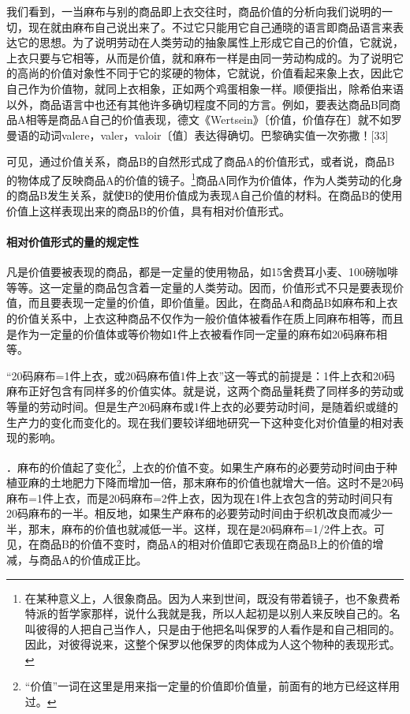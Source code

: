 \documentclass{ctexbook}
\begin{document}
                我们看到，一当麻布与别的商品即上衣交往时，商品价值的分析向我们说明的一切，现在就由麻布自己说出来了。不过它只能用它自己通晓的语言即商品语言来表达它的思想。为了说明劳动在人类劳动的抽象属性上形成它自己的价值，它就说，上衣只要与它相等，从而是价值，就和麻布一样是由同一劳动构成的。为了说明它的高尚的价值对象性不同于它的浆硬的物体，它就说，价值看起来象上衣，因此它自己作为价值物，就同上衣相象，正如两个鸡蛋相象一样。顺便指出，除希伯来语以外，商品语言中也还有其他许多确切程度不同的方言。例如，要表达商品B同商品A相等是商品A自己的价值表现，德文《Wertsein》〔价值，价值存在〕就不如罗曼语的动词valere，valer，valoir〔值〕表达得确切。巴黎确实值一次弥撒！[33]
                
                可见，通过价值关系，商品B的自然形式成了商品A的价值形式，或者说，商品B的物体成了反映商品A的价值的镜子。\footnote{在某种意义上，人很象商品。因为人来到世间，既没有带着镜子，也不象费希特派的哲学家那样，说什么我就是我，所以人起初是以别人来反映自己的。名叫彼得的人把自己当作人，只是由于他把名叫保罗的人看作是和自己相同的。因此，对彼得说来，这整个保罗以他保罗的肉体成为人这个物种的表现形式。}商品A同作为价值体，作为人类劳动的化身的商品B发生关系，就使B的使用价值成为表现A自己价值的材料。在商品B的使用价值上这样表现出来的商品B的价值，具有相对价值形式。
                
                \paragraph{相对价值形式的量的规定性}

                凡是价值要被表现的商品，都是一定量的使用物品，如15舍费耳小麦、100磅咖啡等等。这一定量的商品包含着一定量的人类劳动。因而，价值形式不只是要表现价值，而且要表现一定量的价值，即价值量。因此，在商品A和商品B如麻布和上衣的价值关系中，上衣这种商品不仅作为一般价值体被看作在质上同麻布相等，而且是作为一定量的价值体或等价物如1件上衣被看作同一定量的麻布如20码麻布相等。
                
                “20码麻布=1件上衣，或20码麻布值1件上衣”这一等式的前提是：1件上衣和20码麻布正好包含有同样多的价值实体。就是说，这两个商品量耗费了同样多的劳动或等量的劳动时间。但是生产20码麻布或1件上衣的必要劳动时间，是随着织或缝的生产力的变化而变化的。现在我们要较详细地研究一下这种变化对价值量的相对表现的影响。
                
                \uppercase\expandafter{}．麻布的价值起了变化\footnote{“价值”一词在这里是用来指一定量的价值即价值量，前面有的地方已经这样用过。}，上衣的价值不变。如果生产麻布的必要劳动时间由于种植亚麻的土地肥力下降而增加一倍，那末麻布的价值也就增大一倍。这时不是20码麻布=1件上衣，而是20码麻布=2件上衣，因为现在1件上衣包含的劳动时间只有20码麻布的一半。相反地，如果生产麻布的必要劳动时间由于织机改良而减少一半，那末，麻布的价值也就减低一半。这样，现在是20码麻布=1/2件上衣。可见，在商品B的价值不变时，商品A的相对价值即它表现在商品B上的价值的增减，与商品A的价值成正比。
                
\end{document}
